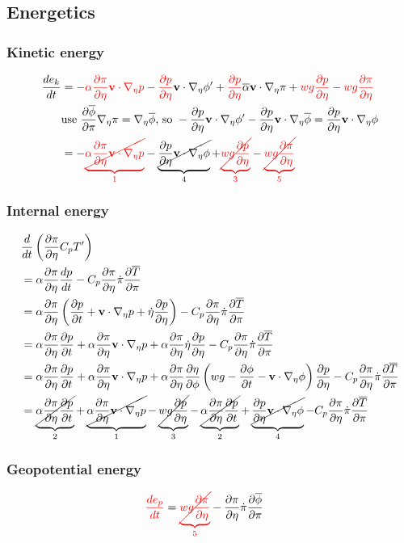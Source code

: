 \documentclass[12pt]{article}
\renewcommand{\d}[2]{\frac{d #1}{d #2}}
\newcommand{\dt}[1]{\d{#1}{t}}
\newcommand{\pd}[2]{\frac{\partial #1}{\partial #2}}
\newcommand{\pdt}[1]{\pd{#1}{t}}
\renewcommand{\vec}[1]{\mathbf{#1}}
\newcommand{\grad}[2][\pi]{\nabla_{#1} #2}
\begin{document}
\subsection{Energetics}

\subsubsection{Kinetic energy}
\begin{align*}
  \dt{e_k} & = - {\color{red}\alpha \pd{\pi}{\eta} \vec{v} \cdot \grad[\eta]{p}} - {\color{red}\pd{p}{\eta}} \vec{v} \cdot \grad[\eta]{\phi^\prime} + {\color{red}\pd{p}{\eta}} \overline{\alpha} \vec{v} \cdot \grad[\eta]{\pi} + {\color{red}w g \pd{p}{\eta}} - {\color{red}w g \pd{\pi}{\eta}} \\
  & \text{use } \pd{\overline{\phi}}{\pi} \grad[\eta]{\pi} = \grad[\eta]{\overline{\phi}} \text{, so } - \pd{p}{\eta} \vec{v} \cdot \grad[\eta]{\phi^\prime} - \pd{p}{\eta} \vec{v} \cdot \grad[\eta]{\overline{\phi}} = \pd{p}{\eta} \vec{v} \cdot \grad[\eta]{\phi} \\
  & = - {\color{red}\underbrace{\cancel{\alpha \pd{\pi}{\eta} \vec{v} \cdot \grad[\eta]{p}}}_1} - \underbrace{\cancel{\pd{p}{\eta} \vec{v} \cdot \grad[\eta]{\phi}}}_4 + {\color{red}\underbrace{\cancel{w g \pd{p}{\eta}}}_3} - {\color{red}\underbrace{\cancel{w g \pd{\pi}{\eta}}}_5}
\end{align*}

\subsubsection{Internal energy}

\begin{align*}
  & \dt{} \left(\pd{\pi}{\eta} C_p T^\prime\right) \\
  & = \alpha \pd{\pi}{\eta} \dt{p} - C_p \pd{\pi}{\eta} \dot{\pi} \pd{\overline{T}}{\pi} \\
  & = \alpha \pd{\pi}{\eta} \left(\pdt{p} + \vec{v} \cdot \grad[\eta]{p} + \dot{\eta} \pd{p}{\eta}\right) - C_p \pd{\pi}{\eta} \dot{\pi} \pd{\overline{T}}{\pi} \\
  & = \alpha \pd{\pi}{\eta} \pdt{p} + \alpha \pd{\pi}{\eta} \vec{v} \cdot \grad[\eta]{p} + \alpha \pd{\pi}{\eta} \dot{\eta} \pd{p}{\eta} - C_p \pd{\pi}{\eta} \dot{\pi} \pd{\overline{T}}{\pi} \\
  & = \alpha \pd{\pi}{\eta} \pdt{p} + \alpha \pd{\pi}{\eta} \vec{v} \cdot \grad[\eta]{p} + \alpha \pd{\pi}{\eta} \pd{\eta}{\phi} \left(w g - \pdt{\phi} - \vec{v} \cdot \grad[\eta]{\phi}\right) \pd{p}{\eta} - C_p \pd{\pi}{\eta} \dot{\pi} \pd{\overline{T}}{\pi} \\
  & = \underbrace{\cancel{\alpha \pd{\pi}{\eta} \pdt{p}}}_2 + \underbrace{\cancel{\alpha \pd{\pi}{\eta} \vec{v} \cdot \grad[\eta]{p}}}_1 - \underbrace{\cancel{w g \pd{p}{\eta}}}_3 - \underbrace{\cancel{\alpha \pd{\pi}{\eta} \pdt{p}}}_2 + \underbrace{\cancel{\pd{p}{\eta} \vec{v} \cdot \grad[\eta]{\phi}}}_4 - C_p \pd{\pi}{\eta} \dot{\pi} \pd{\overline{T}}{\pi}
\end{align*}

\subsubsection{Geopotential energy}

\begin{align*}
  {\color{red}\dt{e_p}} & = {\color{red}\underbrace{\cancel{w g \pd{\pi}{\eta}}}_5} - \pd{\pi}{\eta} \dot{\pi} \pd{\overline{\phi}}{\pi}
\end{align*}
\end{document}
